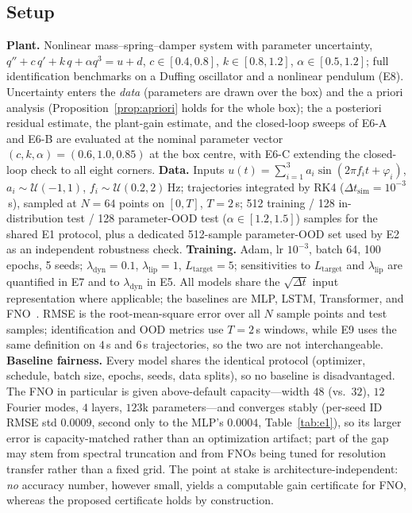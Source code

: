 \documentclass[11pt]{article}
\newcommand{\Ltarget}{L_{\mathrm{target}}}
\begin{document}
\subsection{Setup}
\textbf{Plant.} Nonlinear mass--spring--damper system with parameter
uncertainty,
$q''+c\,q'+k\,q+\alpha q^3=u+d$,
$c\in[0.4,0.8]$, $k\in[0.8,1.2]$, $\alpha\in[0.5,1.2]$; full identification
benchmarks on a Duffing oscillator and a nonlinear pendulum (E8). Uncertainty
enters the \emph{data} (parameters are drawn over the box) and the a priori
analysis (Proposition~\ref{prop:apriori} holds for the whole box); the
a posteriori residual estimate, the plant-gain estimate, and the closed-loop
sweeps of E6-A and E6-B are evaluated at the nominal parameter vector
$(c,k,\alpha)=(0.6,1.0,0.85)$ at the box centre, with E6-C extending the
closed-loop check to all eight corners. \textbf{Data.} Inputs
$u(t)=\sum_{i=1}^{3}a_i\sin(2\pi f_i t+\varphi_i)$,
$a_i\sim\mathcal{U}(-1,1)$, $f_i\sim\mathcal{U}(0.2,2)$\,Hz; trajectories
integrated by RK4 ($\Delta t_{\mathrm{sim}}=10^{-3}$\,s), sampled at $N=64$
points on $[0,T]$, $T=2$\,s; 512 training / 128 in-distribution test / 128
parameter-OOD test ($\alpha\in[1.2,1.5]$) samples for the shared E1
protocol, plus a dedicated 512-sample parameter-OOD set used by E2 as an
independent robustness check.
\textbf{Training.} Adam, lr $10^{-3}$, batch 64, 100 epochs, 5 seeds;
$\lambda_{\mathrm{dyn}}=0.1$, $\lambda_{\mathrm{lip}}=1$, $\Ltarget=5$;
sensitivities to $\Ltarget$ and $\lambda_{\mathrm{lip}}$ are quantified in
E7 and to $\lambda_{\mathrm{dyn}}$ in E5.
All models share the $\sqrt{\Delta t}$ input representation where applicable;
the baselines are MLP, LSTM, Transformer, and FNO~\citep{li2021fno}.
RMSE is the root-mean-square error over all $N$ sample points and test
samples; identification and OOD metrics use $T=2$\,s windows, while E9 uses
the same definition on $4$\,s and $6$\,s trajectories, so the two are not
interchangeable.
\textbf{Baseline fairness.} Every model shares the identical protocol
(optimizer, schedule, batch size, epochs, seeds, data splits), so no baseline
is disadvantaged. The FNO in particular is given above-default
capacity---width $48$ (vs.\ $32$), $12$ Fourier modes, $4$ layers, $123$k
parameters---and converges stably (per-seed ID RMSE std $0.0009$, second only
to the MLP's $0.0004$, Table~\ref{tab:e1}), so its larger error is
capacity-matched rather than an optimization artifact; part of the gap may
stem from spectral truncation and from FNOs being tuned for resolution
transfer rather than a fixed grid. The point at stake is
architecture-independent: \emph{no} accuracy number, however small, yields a
computable gain certificate for FNO, whereas the proposed certificate holds by
construction.
\end{document}
